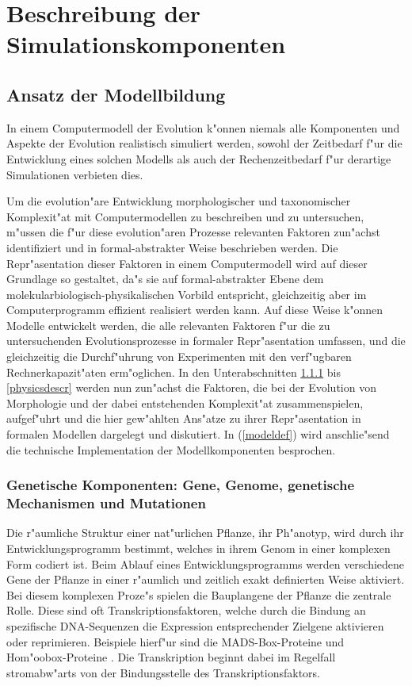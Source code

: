 \chapter{Beschreibung der Simulationskomponenten}


\section{Ansatz der Modellbildung}
\label{modellansatz}

In einem Computermodell der Evolution k"onnen niemals alle Komponenten und
Aspekte der Evolution realistisch simuliert werden, sowohl der Zeitbedarf
f"ur die Entwicklung eines solchen Modells als auch der Rechenzeitbedarf
f"ur derartige Simulationen verbieten dies. 

Um die evolution"are Entwicklung morphologischer
und taxonomischer Komplexit"at mit Computermodellen zu beschreiben und zu
untersuchen, m"ussen die f"ur diese evolution"aren Prozesse
relevanten Faktoren zun"achst identifiziert und in formal-abstrakter Weise
beschrieben werden. Die Repr"asentation dieser Faktoren in einem Computermodell
wird auf dieser Grundlage so gestaltet, da"s sie auf formal-abstrakter Ebene
dem molekularbiologisch-physikalischen Vorbild entspricht, gleichzeitig aber
im Computerprogramm effizient realisiert werden kann. Auf diese Weise k"onnen
Modelle entwickelt werden, die alle relevanten Faktoren f"ur die zu
untersuchenden Evolutionsprozesse in formaler
Repr"asentation umfassen, und die gleichzeitig die Durchf"uhrung von Experimenten
mit den verf"ugbaren Rechnerkapazit"aten erm"oglichen. In den Unterabschnitten
\ref{genedescr} bis \ref{physicsdescr} werden nun zun"achst die Faktoren, die
bei der Evolution von Morphologie und der dabei entstehenden Komplexit"at
zusammenspielen, aufgef"uhrt und die hier gew"ahlten Ans"atze zu ihrer
Repr"asentation in formalen Modellen dargelegt und diskutiert. In
(\ref{modeldef}) wird anschlie"send die technische Implementation der Modellkomponenten
besprochen.


\subsection{Genetische Komponenten: Gene, Genome, genetische \\ Mechanismen und Mutationen}
\label{genedescr}

Die r"aumliche Struktur einer nat"urlichen Pflanze, ihr Ph"anotyp,
wird durch ihr Entwicklungsprogramm bestimmt, welches in ihrem Genom
in einer komplexen Form codiert ist.
Beim Ablauf eines Entwicklungsprogramms werden verschiedene Gene der Pflanze
in einer r"aumlich und zeitlich exakt definierten Weise aktiviert. Bei diesem
komplexen Proze"s spielen die Bauplangene der Pflanze die zentrale Rolle.
Diese sind oft Transkriptionsfaktoren, welche durch die Bindung an spezifische
DNA-Sequenzen die Expression entsprechender Zielgene aktivieren oder
reprimieren. Beispiele hierf"ur sind die MADS-Box-Proteine \cite{Shore95} und Hom"oobox-Proteine
\cite{Carroll95}. Die Transkription beginnt dabei im Regelfall stromabw"arts von der Bindungsstelle
des Transkriptionsfaktors.

